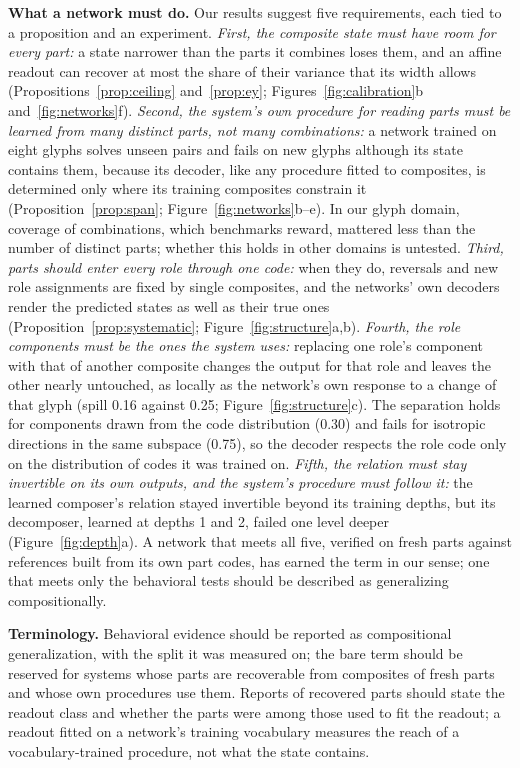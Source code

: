 \documentclass[10pt]{article}
\theoremstyle{plain}
\theoremstyle{remark}
\begin{document}
\textbf{What a network must do.} Our results suggest five requirements, each tied to a proposition and an experiment. \emph{First, the composite state must have room for every part:} a state narrower than the parts it combines loses them, and an affine readout can recover at most the share of their variance that its width allows (Propositions~\ref{prop:ceiling} and~\ref{prop:ey}; Figures~\ref{fig:calibration}b and~\ref{fig:networks}f). \emph{Second, the system's own procedure for reading parts must be learned from many distinct parts, not many combinations:} a network trained on eight glyphs solves unseen pairs and fails on new glyphs although its state contains them, because its decoder, like any procedure fitted to composites, is determined only where its training composites constrain it (Proposition~\ref{prop:span}; Figure~\ref{fig:networks}b--e). In our glyph domain, coverage of combinations, which benchmarks reward, mattered less than the number of distinct parts; whether this holds in other domains is untested. \emph{Third, parts should enter every role through one code:} when they do, reversals and new role assignments are fixed by single composites, and the networks' own decoders render the predicted states as well as their true ones (Proposition~\ref{prop:systematic}; Figure~\ref{fig:structure}a,b). \emph{Fourth, the role components must be the ones the system uses:} replacing one role's component with that of another composite changes the output for that role and leaves the other nearly untouched, as locally as the network's own response to a change of that glyph (spill 0.16 against 0.25; Figure~\ref{fig:structure}c). The separation holds for components drawn from the code distribution (0.30) and fails for isotropic directions in the same subspace (0.75), so the decoder respects the role code only on the distribution of codes it was trained on. \emph{Fifth, the relation must stay invertible on its own outputs, and the system's procedure must follow it:} the learned composer's relation stayed invertible beyond its training depths, but its decomposer, learned at depths 1 and 2, failed one level deeper (Figure~\ref{fig:depth}a). A network that meets all five, verified on fresh parts against references built from its own part codes, has earned the term in our sense; one that meets only the behavioral tests should be described as generalizing compositionally.

\textbf{Terminology.} Behavioral evidence should be reported as compositional generalization, with the split it was measured on; the bare term should be reserved for systems whose parts are recoverable from composites of fresh parts and whose own procedures use them. Reports of recovered parts should state the readout class and whether the parts were among those used to fit the readout; a readout fitted on a network's training vocabulary measures the reach of a vocabulary-trained procedure, not what the state contains.
\end{document}

